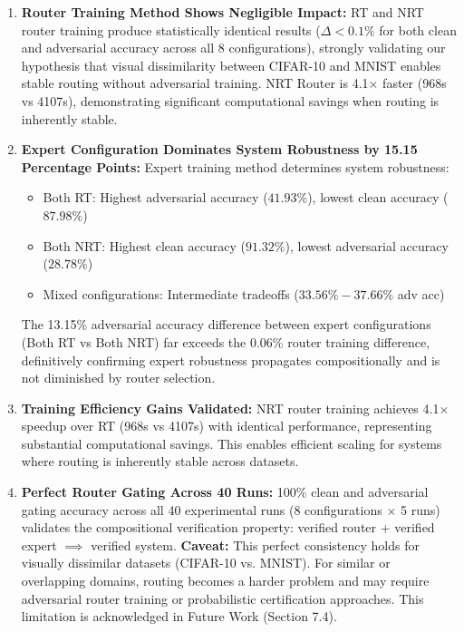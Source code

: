 \documentclass[11pt,a4paper]{article}
\begin{document}
\begin{enumerate}
    \item \textbf{Router Training Method Shows Negligible Impact:} RT and NRT router training produce statistically identical results ($\Delta < 0.1\%$ for both clean and adversarial accuracy across all 8 configurations), strongly validating our hypothesis that visual dissimilarity between CIFAR-10 and MNIST enables stable routing without adversarial training. NRT Router is 4.1$\times$ faster (968s vs 4107s), demonstrating significant computational savings when routing is inherently stable.

    \item \textbf{Expert Configuration Dominates System Robustness by 15.15 Percentage Points:} Expert training method determines system robustness:
    \begin{itemize}
        \item Both RT: Highest adversarial accuracy ($41.93\%$), lowest clean accuracy ($87.98\%$)
        \item Both NRT: Highest clean accuracy ($91.32\%$), lowest adversarial accuracy ($28.78\%$)
        \item Mixed configurations: Intermediate tradeoffs ($33.56\%-37.66\%$ adv acc)
    \end{itemize}
    The 13.15\% adversarial accuracy difference between expert configurations (Both RT vs Both NRT) far exceeds the 0.06\% router training difference, definitively confirming expert robustness propagates compositionally and is not diminished by router selection.

    \item \textbf{Training Efficiency Gains Validated:} NRT router training achieves 4.1$\times$ speedup over RT (968s vs 4107s) with identical performance, representing substantial computational savings. This enables efficient scaling for systems where routing is inherently stable across datasets.

    \item \textbf{Perfect Router Gating Across 40 Runs:} 100\% clean and adversarial gating accuracy across all 40 experimental runs (8 configurations $\times$ 5 runs) validates the compositional verification property: verified router + verified expert $\implies$ verified system. \textbf{Caveat:} This perfect consistency holds for visually dissimilar datasets (CIFAR-10 vs. MNIST). For similar or overlapping domains, routing becomes a harder problem and may require adversarial router training or probabilistic certification approaches. This limitation is acknowledged in Future Work (Section 7.4).


\end{enumerate}
\end{document}
